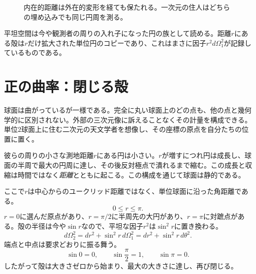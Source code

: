 \begin{figure}[htbp]
\centering
{}
\caption{内在的距離は外在的変形を経ても保たれる。一次元の住人はどちらの埋め込みでも同じ円周を測る。}
\label{fig:c03-intrinsic-redraw}
\end{figure}

平坦空間は今や観測者の周りの入れ子になった円の族として読める。距離\(r\)にある殻は\(r\)だけ拡大された単位円のコピーであり、これはまさに因子\(r^2d\Omega_1^2\)が記録しているものである。

\section{正の曲率：閉じる殻}

球面は曲がっているが一様である。完全に丸い球面上のどの点も、他の点と幾何学的に区別されない。外部の三次元像に訴えることなくその計量を構成できる。単位\(2\)球面上に住む二次元の天文学者を想像し、その座標の原点を自分たちの位置に置く。

彼らの周りの小さな測地距離\(r\)にある円は小さい。\(r\)が増すにつれ円は成長し、球面の半周で最大の円周に達し、その後反対極点で潰れるまで縮む。この成長と収縮は時間ではなく\emph{距離}とともに起こる。この構成を通じて球面は静的である。

ここで\(r\)は中心からのユークリッド距離ではなく、単位球面に沿った角距離である。
\[
0 \le r \le \pi.
\]
\(r=0\)に選んだ原点があり、\(r=\pi/2\)に半周先の大円があり、\(r=\pi\)に対蹠点がある。殻の半径は今や\(\sin r\)なので、平坦な因子\(r^2\)は\(\sin^2r\)に置き換わる。
\begin{equation}
d\Omega_2^2 = dr^2 + \sin^2 r\, d\Omega_1^2
            = dr^2 + \sin^2 r\, d\theta^2.
\label{eq:c03-two-sphere}
\end{equation}
端点と中点は要求どおりに振る舞う。
\begin{equation}
\sin 0=0,
\qquad
\sin\frac{\pi}{2}=1,
\qquad
\sin\pi=0.
\end{equation}
したがって殻は大きさゼロから始まり、最大の大きさに達し、再び閉じる。

